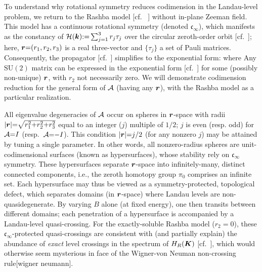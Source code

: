 \documentclass[aps, prb, showpacs, twocolumn, notitlepage, superscriptaddress]{revtex4-1}
\begin{document}

To understand why rotational symmetry reduces codimension in the Landau-level problem, we return to the Rashba model [cf. \ ] without in-plane Zeeman field. This model has a continuous rotational symmetry (denoted $\mathfrak{c}_{\infty}$), which manifests as the constancy of ${\cal H}(\boldsymbol{k}){:}{=}\sum_{j=1}^3r_j\tau_j$ over the circular zeroth-order orbit [cf.\ ]; here, $\boldsymbol{r}{=}(r_1,r_2,r_3)$ is a real three-vector and $\{\tau_j\}$ a set of Pauli matrices. Consequently, the propagator [cf.\ ] simplifies to the exponential form:
where
Any $\text{SU}(2)$ matrix can be expressed in the exponential form [cf.\ ] for some (possibly non-unique) $\boldsymbol{r}$, with $r_2$ not necessarily zero. We will demonstrate codimension reduction for the general form of ${\cal A}$ (having any $\boldsymbol{r}$), with the Rashba model as a particular realization.

All eigenvalue degeneracies of ${\cal A}$ occur on spheres in $\boldsymbol{r}$-space with radii $|\boldsymbol{r}|{=}\sqrt{r_1^2{+}r_2^2{+}r_3^2}$ equal to an integer ($j$)  multiple of $1/2$;  ${j}$ is even (resp. odd) for  ${\cal A}{=}I$ (resp.\ ${\cal A}{=}{-}I$).  This condition $|\boldsymbol{r}|{=}j/2$ (for any nonzero $j$) may be attained by tuning a single parameter. In other words,
all nonzero-radius spheres are unit-codimensional surfaces (known as hypersurfaces), whose stability rely on $\mathfrak{c}_{\infty}$ symmetry. These hypersurfaces separate $\boldsymbol{r}$-space into infinitely-many, distinct connected components, i.e., the zeroth homotopy group $\pi_0$ comprises an infinite set. Each hypersurface may thus be viewed as a symmetry-protected, topological defect, which separates domains (in $\boldsymbol{r}$-space) where Landau levels are non-quasidegenerate. By varying $B$ alone (at fixed energy), one then transits between different domains; each penetration of a hypersurface is accompanied by a Landau-level quasi-crossing. For the exactly-soluble Rashba model ($r_2{=}0$), these $\mathfrak{c}_{\infty}$-protected quasi-crossings  are consistent with (and partially explain)  the abundance of \textit{exact} level crossings in the spectrum of $H_R(\boldsymbol{K})$ [cf.\ ], which would otherwise seem mysterious in face of  the Wigner-von Neuman non-crossing rule[wigner neumann].
\end{document}
